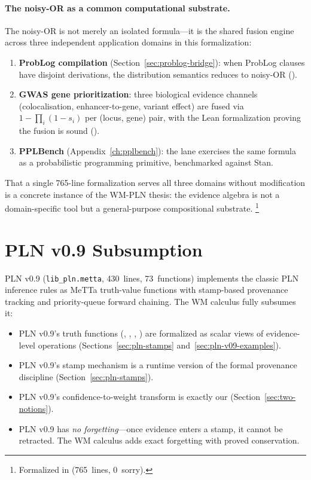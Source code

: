 \documentclass[11pt,openany]{report}
\begin{document}
\paragraph{The noisy-OR as a common computational substrate.}
The noisy-OR is not merely an isolated formula---it is the shared
fusion engine across three independent application domains in this
formalization:
\begin{enumerate}
\item \textbf{ProbLog compilation}
  (Section~\ref{sec:problog-bridge}): when ProbLog clauses have
  disjoint derivations, the distribution semantics reduces to
  noisy-OR ().
\item \textbf{GWAS gene prioritization}: three biological evidence
  channels (colocalisation, enhancer-to-gene, variant effect)
  are fused via $1 - \prod_i(1 - s_i)$ per (locus, gene) pair,
  with the Lean formalization proving the fusion is sound
  ().
\item \textbf{PPLBench} (Appendix~\ref{ch:pplbench}): the
   lane exercises the same formula as a
  probabilistic programming primitive, benchmarked against Stan.
\end{enumerate}

\noindent
That a single 765-line formalization serves all three domains
without modification is a concrete instance of the WM-PLN thesis:
the evidence algebra is not a domain-specific tool but a
general-purpose compositional substrate.%
\footnote{Formalized in  (765~lines, 0~sorry).}


\section{PLN v0.9 Subsumption}
\label{sec:pln-v09-subsumption}

PLN v0.9 (\texttt{lib\_pln.metta}, 430~lines, 73~functions) implements
the classic PLN inference rules as MeTTa truth-value functions with
stamp-based provenance tracking and priority-queue forward chaining.
The WM calculus fully subsumes it:

\begin{itemize}
\item PLN v0.9's truth functions (,
  , ,
  ) are formalized as scalar views of
  evidence-level operations (Sections~\ref{sec:pln-stamps}
  and~\ref{sec:pln-v09-examples}).
\item PLN v0.9's stamp mechanism is a runtime version of the
  formal provenance discipline (Section~\ref{sec:pln-stamps}).
\item PLN v0.9's confidence-to-weight transform 
  is exactly our  (Section~\ref{sec:two-notions}).
\item PLN v0.9 has \emph{no forgetting}---once evidence enters a
  stamp, it cannot be retracted.  The WM calculus adds exact
  forgetting with proved conservation.
\end{itemize}
\end{document}
